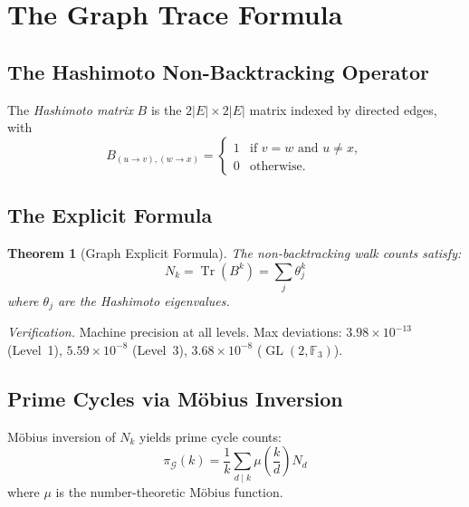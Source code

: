 \documentclass[12pt,reqno]{amsart}
\theoremstyle{plain}
\newtheorem{theorem}{Theorem}[section]
\theoremstyle{definition}
\theoremstyle{remark}
\DeclareMathOperator{\Tr}{Tr}
\DeclareMathOperator{\GL}{GL}
\newcommand{\FF}{\mathbb{F}}
\begin{document}
\section{The Graph Trace Formula}\label{sec:trace}

\subsection{The Hashimoto Non-Backtracking Operator}

The \emph{Hashimoto matrix} $B$ is the $2|E| \times 2|E|$ matrix
indexed by directed edges, with
\begin{equation}\label{eq:hashimoto}
  B_{(u \to v),(w \to x)} =
  \begin{cases}
    1 & \text{if } v = w \text{ and } u \neq x, \\
    0 & \text{otherwise.}
  \end{cases}
\end{equation}

\subsection{The Explicit Formula}

\begin{theorem}[Graph Explicit Formula]\label{thm:explicit}
  The non-backtracking walk counts satisfy:
  \begin{equation}\label{eq:explicit}
    N_k = \Tr(B^k) = \sum_j \theta_j^k
  \end{equation}
  where $\theta_j$ are the Hashimoto eigenvalues.
\end{theorem}

\emph{Verification.}  Machine precision at all levels.  Max
deviations: $3.98 \times 10^{-13}$ (Level~1), $5.59 \times 10^{-8}$
(Level~3), $3.68 \times 10^{-8}$ ($\GL(2,\FF_3)$).

\subsection{Prime Cycles via M\"obius Inversion}

M\"obius inversion of $N_k$ yields prime cycle counts:
\begin{equation}\label{eq:mobius}
  \pi_\mathcal{G}(k) = \frac{1}{k} \sum_{d \mid k}
  \mu\!\left(\frac{k}{d}\right) N_d
\end{equation}
where $\mu$ is the number-theoretic M\"obius function.
\end{document}
